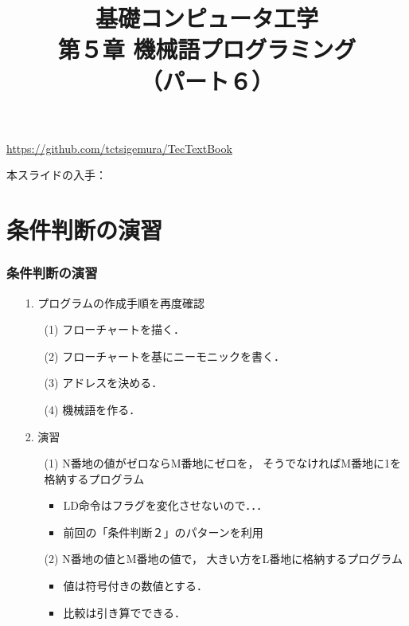 \documentclass{beamer}                 %
\begin{document}
\title{基礎コンピュータ工学\\第５章 機械語プログラミング\\（パート６）}
\date{}

\begin{frame}
  \titlepage
  \centerline{\url{https://github.com/tctsigemura/TecTextBook}}
  \vfill
  \centerline{本スライドの入手：
    }
\end{frame}


\section{条件判断の演習}
\begin{frame}
  \frametitle{条件判断の演習}
  \begin{enumerate}
  \item[1.] プログラムの作成手順を再度確認
    \begin{enumerate}
    \item[(1)] フローチャートを描く．
    \item[(2)] フローチャートを基にニーモニックを書く．
    \item[(3)] アドレスを決める．
    \item[(4)] 機械語を作る．
    \end{enumerate}
    \vfill
  \item[2.] 演習
    \begin{enumerate}
    \item[(1)] N番地の値がゼロならM番地にゼロを，
      そうでなければM番地に1を格納するプログラム
      \begin{itemize}
      \item LD命令はフラグを変化させないので．．．
      \item 前回の「条件判断２」のパターンを利用
      \end{itemize}
      \vfill
    \item[(2)] N番地の値とM番地の値で，
      大きい方をL番地に格納するプログラム
      \begin{itemize}
      \item 値は符号付きの数値とする．
      \item 比較は引き算でできる．
      \end{itemize}
    \end{enumerate}
  \end{enumerate}
  \vfill
\end{frame}
\end{document}
